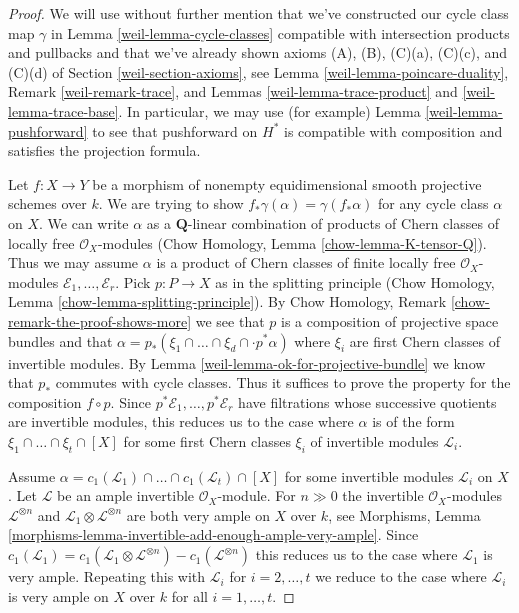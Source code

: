 \begin{proof}

We will use without further mention that we've constructed our
cycle class map $\gamma$ in Lemma \ref{weil-lemma-cycle-classes}
compatible with intersection products and pullbacks and that
we've already shown axioms
(A), (B), (C)(a), (C)(c), and (C)(d) of Section \ref{weil-section-axioms}, see
Lemma \ref{weil-lemma-poincare-duality},
Remark \ref{weil-remark-trace}, and
Lemmas \ref{weil-lemma-trace-product} and \ref{weil-lemma-trace-base}.
In particular, we may use (for example) Lemma \ref{weil-lemma-pushforward}
to see that pushforward on $H^*$ is compatible with composition
and satisfies the projection formula.

\medskip\noindent
Let $f : X \to Y$ be a morphism of nonempty
equidimensional smooth projective schemes over $k$.
We are trying to show $f_*\gamma(\alpha) = \gamma(f_*\alpha)$
for any cycle class $\alpha$ on $X$.
We can write $\alpha$ as a $\mathbf{Q}$-linear combination of products of
Chern classes of locally free $\mathcal{O}_X$-modules
(Chow Homology, Lemma \ref{chow-lemma-K-tensor-Q}).
Thus we may assume $\alpha$ is a product of Chern classes of
finite locally free $\mathcal{O}_X$-modules
$\mathcal{E}_1, \ldots, \mathcal{E}_r$.
Pick $p : P \to X$ as in the splitting principle
(Chow Homology, Lemma \ref{chow-lemma-splitting-principle}).
By Chow Homology, Remark \ref{chow-remark-the-proof-shows-more}
we see that $p$ is a composition of projective space bundles and
that $\alpha = p_*(\xi_1 \cap \ldots \cap \xi_d \cap \cdot p^*\alpha)$
where $\xi_i$ are first Chern classes of invertible modules.
By Lemma \ref{weil-lemma-ok-for-projective-bundle}
we know that $p_*$ commutes with cycle classes.
Thus it suffices to prove the property for the composition
$f \circ p$. Since $p^*\mathcal{E}_1, \ldots, p^*\mathcal{E}_r$
have filtrations whose successive quotients are invertible
modules, this reduces us to the case where $\alpha$ is
of the form $\xi_1 \cap \ldots \cap \xi_t \cap [X]$
for some first Chern classes $\xi_i$ of invertible modules $\mathcal{L}_i$.

\medskip\noindent
Assume
$\alpha = c_1(\mathcal{L}_1) \cap \ldots \cap c_1(\mathcal{L}_t) \cap [X]$
for some invertible modules $\mathcal{L}_i$ on $X$.
Let $\mathcal{L}$ be an ample invertible $\mathcal{O}_X$-module.
For $n \gg 0$ the invertible $\mathcal{O}_X$-modules
$\mathcal{L}^{\otimes n}$ and
$\mathcal{L}_1 \otimes \mathcal{L}^{\otimes n}$ are both
very ample on $X$ over $k$, see
Morphisms, Lemma \ref{morphisms-lemma-invertible-add-enough-ample-very-ample}.
Since $c_1(\mathcal{L}_1) = c_1(\mathcal{L}_1 \otimes \mathcal{L}^{\otimes n})
- c_1(\mathcal{L}^{\otimes n})$ this reduces us to the case where
$\mathcal{L}_1$ is very ample. Repeating this with $\mathcal{L}_i$
for $i = 2, \ldots, t$ we reduce to the case where $\mathcal{L}_i$
is very ample on $X$ over $k$ for all $i = 1, \ldots, t$.


\end{proof}
